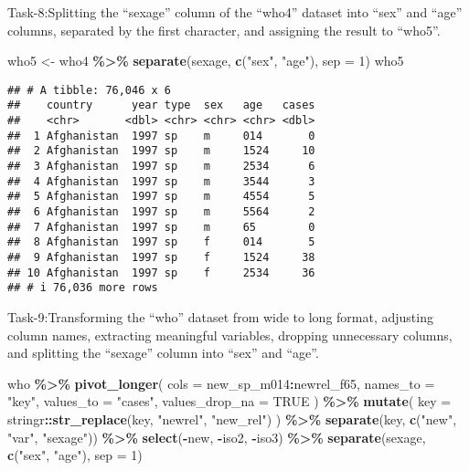 \documentclass[
]{article}
\newenvironment{Shaded}{\begin{snugshade}}{\end{snugshade}}
\newcommand{\AttributeTok}[1]{\textcolor[rgb]{0.13,0.29,0.53}{#1}}
\newcommand{\ConstantTok}[1]{\textcolor[rgb]{0.56,0.35,0.01}{#1}}
\newcommand{\DecValTok}[1]{\textcolor[rgb]{0.00,0.00,0.81}{#1}}
\newcommand{\FunctionTok}[1]{\textcolor[rgb]{0.13,0.29,0.53}{\textbf{#1}}}
\newcommand{\NormalTok}[1]{#1}
\newcommand{\OtherTok}[1]{\textcolor[rgb]{0.56,0.35,0.01}{#1}}
\newcommand{\SpecialCharTok}[1]{\textcolor[rgb]{0.81,0.36,0.00}{\textbf{#1}}}
\newcommand{\StringTok}[1]{\textcolor[rgb]{0.31,0.60,0.02}{#1}}
\begin{document}
Task-8:Splitting the ``sexage'' column of the ``who4'' dataset into
``sex'' and ``age'' columns, separated by the first character, and
assigning the result to ``who5''.

\begin{Shaded}
\begin{Highlighting}[]
\NormalTok{who5 }\OtherTok{\textless{}{-}}\NormalTok{ who4 }\SpecialCharTok{\%\textgreater{}\%} 
  \FunctionTok{separate}\NormalTok{(sexage, }\FunctionTok{c}\NormalTok{(}\StringTok{"sex"}\NormalTok{, }\StringTok{"age"}\NormalTok{), }\AttributeTok{sep =} \DecValTok{1}\NormalTok{)}
\NormalTok{who5}
\end{Highlighting}
\end{Shaded}

\begin{verbatim}
## # A tibble: 76,046 x 6
##    country      year type  sex   age   cases
##    <chr>       <dbl> <chr> <chr> <chr> <dbl>
##  1 Afghanistan  1997 sp    m     014       0
##  2 Afghanistan  1997 sp    m     1524     10
##  3 Afghanistan  1997 sp    m     2534      6
##  4 Afghanistan  1997 sp    m     3544      3
##  5 Afghanistan  1997 sp    m     4554      5
##  6 Afghanistan  1997 sp    m     5564      2
##  7 Afghanistan  1997 sp    m     65        0
##  8 Afghanistan  1997 sp    f     014       5
##  9 Afghanistan  1997 sp    f     1524     38
## 10 Afghanistan  1997 sp    f     2534     36
## # i 76,036 more rows
\end{verbatim}

Task-9:Transforming the ``who'' dataset from wide to long format,
adjusting column names, extracting meaningful variables, dropping
unnecessary columns, and splitting the ``sexage'' column into ``sex''
and ``age''.

\begin{Shaded}
\begin{Highlighting}[]
\NormalTok{who }\SpecialCharTok{\%\textgreater{}\%}
  \FunctionTok{pivot\_longer}\NormalTok{(}
    \AttributeTok{cols =}\NormalTok{ new\_sp\_m014}\SpecialCharTok{:}\NormalTok{newrel\_f65, }
    \AttributeTok{names\_to =} \StringTok{"key"}\NormalTok{, }
    \AttributeTok{values\_to =} \StringTok{"cases"}\NormalTok{, }
    \AttributeTok{values\_drop\_na =} \ConstantTok{TRUE}
\NormalTok{  ) }\SpecialCharTok{\%\textgreater{}\%} 
  \FunctionTok{mutate}\NormalTok{(}
    \AttributeTok{key =}\NormalTok{ stringr}\SpecialCharTok{::}\FunctionTok{str\_replace}\NormalTok{(key, }\StringTok{"newrel"}\NormalTok{, }\StringTok{"new\_rel"}\NormalTok{)}
\NormalTok{  ) }\SpecialCharTok{\%\textgreater{}\%}
  \FunctionTok{separate}\NormalTok{(key, }\FunctionTok{c}\NormalTok{(}\StringTok{"new"}\NormalTok{, }\StringTok{"var"}\NormalTok{, }\StringTok{"sexage"}\NormalTok{)) }\SpecialCharTok{\%\textgreater{}\%} 
  \FunctionTok{select}\NormalTok{(}\SpecialCharTok{{-}}\NormalTok{new, }\SpecialCharTok{{-}}\NormalTok{iso2, }\SpecialCharTok{{-}}\NormalTok{iso3) }\SpecialCharTok{\%\textgreater{}\%} 
  \FunctionTok{separate}\NormalTok{(sexage, }\FunctionTok{c}\NormalTok{(}\StringTok{"sex"}\NormalTok{, }\StringTok{"age"}\NormalTok{), }\AttributeTok{sep =} \DecValTok{1}\NormalTok{)}
\end{Highlighting}
\end{Shaded}
\end{document}
